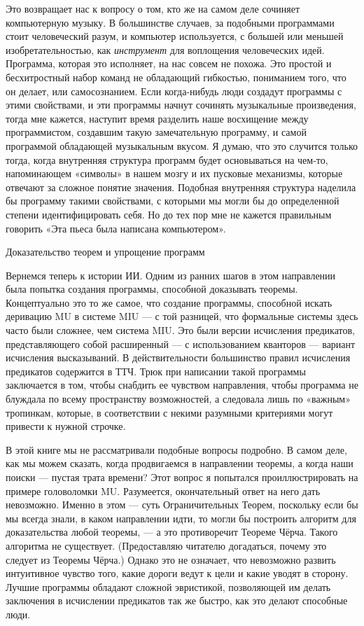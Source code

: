 Это возвращает нас к вопросу о том, кто же на самом деле сочиняет компьютерную музыку. В большинстве случаев, за подобными программами стоит человеческий разум, и компьютер используется, с большей или меньшей изобретательностью, как \emph{инструмент} для воплощения человеческих идей. Программа, которая это исполняет, на нас совсем не похожа. Это простой и бесхитростный набор команд не обладающий гибкостью, пониманием того, что он делает, или самосознанием. Если когда-нибудь люди создадут программы с этими свойствами, и эти программы начнут сочинять музыкальные произведения, тогда мне кажется, наступит время разделить наше восхищение между программистом, создавшим такую замечательную программу, и самой программой обладающей музыкальным вкусом. Я думаю, что это случится только тогда, когда внутренняя структура программ будет основываться на чем-то, напоминающем «символы» в нашем мозгу и их пусковые механизмы, которые отвечают за сложное понятие значения. Подобная внутренняя структура наделила бы программу такими свойствами, с которыми мы могли бы до определенной степени идентифицировать себя. Но до тех пор мне не кажется правильным говорить «Эта пьеса была написана компьютером».

Доказательство теорем и упрощение программ

Вернемся теперь к истории ИИ. Одним из ранних шагов в этом направлении была попытка создания программы, способной доказывать теоремы. Концептуально это то же самое, что создание программы, способной искать деривацию MU в системе MIU --- с той разницей, что формальные системы здесь часто были сложнее, чем система MIU. Это были версии исчисления предикатов, представляющего собой расширенный --- с использованием кванторов --- вариант исчисления высказываний. В действительности большинство правил исчисления предикатов содержится в ТТЧ. Трюк при написании такой программы заключается в том, чтобы снабдить ее чувством направления, чтобы программа не блуждала по всему пространству возможностей, а следовала лишь по «важным» тропинкам, которые, в соответствии с некими разумными критериями могут привести к нужной строчке.

В этой книге мы не рассматривали подобные вопросы подробно. В самом деле, как мы можем сказать, когда продвигаемся в направлении теоремы, а когда наши поиски --- пустая трата времени? Этот вопрос я попытался проиллюстрировать на примере головоломки MU. Разумеется, окончательный ответ на него дать невозможно. Именно в этом --- суть Ограничительных Теорем, поскольку если бы мы всегда знали, в каком направлении идти, то могли бы построить алгоритм для доказательства любой теоремы, --- а это противоречит Теореме Чёрча. Такого алгоритма не существует. (Предоставляю читателю догадаться, почему это следует из Теоремы Чёрча.) Однако это не означает, что невозможно развить интуитивное чувство того, какие дороги ведут к цели и какие уводят в сторону. Лучшие программы обладают сложной эвристикой, позволяющей им делать заключения в исчислении предикатов так же быстро, как это делают способные люди.

